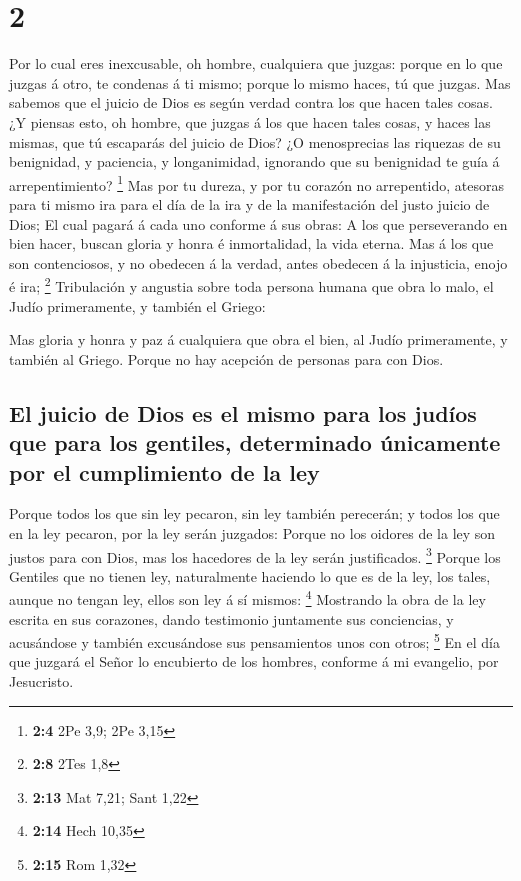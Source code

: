 \hypertarget{section-1}{%
\section{2}\label{section-1}}

 Por lo cual eres inexcusable, oh hombre, cualquiera que
juzgas: porque en lo que juzgas á otro, te condenas á ti mismo; porque
lo mismo haces, tú que juzgas.  Mas sabemos que el juicio
de Dios es según verdad contra los que hacen tales cosas. 
¿Y piensas esto, oh hombre, que juzgas á los que hacen tales cosas, y
haces las mismas, que tú escaparás del juicio de Dios?  ¿O
menosprecias las riquezas de su benignidad, y paciencia, y longanimidad,
ignorando que su benignidad te guía á arrepentimiento? \footnote{\textbf{2:4}
  2Pe 3,9; 2Pe 3,15}  Mas por tu dureza, y por tu corazón
no arrepentido, atesoras para ti mismo ira para el día de la ira y de la
manifestación del justo juicio de Dios;  El cual pagará á
cada uno conforme á sus obras:  A los que perseverando en
bien hacer, buscan gloria y honra é inmortalidad, la vida eterna.
 Mas á los que son contenciosos, y no obedecen á la
verdad, antes obedecen á la injusticia, enojo é ira; \footnote{\textbf{2:8}
  2Tes 1,8}  Tribulación y angustia sobre toda persona
humana que obra lo malo, el Judío primeramente, y también el Griego:

 Mas gloria y honra y paz á cualquiera que obra el bien,
al Judío primeramente, y también al Griego.  Porque no
hay acepción de personas para con Dios.

\hypertarget{el-juicio-de-dios-es-el-mismo-para-los-juduxedos-que-para-los-gentiles-determinado-uxfanicamente-por-el-cumplimiento-de-la-ley}{%
\subsection{El juicio de Dios es el mismo para los judíos que para los
gentiles, determinado únicamente por el cumplimiento de la
ley}\label{el-juicio-de-dios-es-el-mismo-para-los-juduxedos-que-para-los-gentiles-determinado-uxfanicamente-por-el-cumplimiento-de-la-ley}}

 Porque todos los que sin ley pecaron, sin ley también
perecerán; y todos los que en la ley pecaron, por la ley serán juzgados:
 Porque no los oidores de la ley son justos para con
Dios, mas los hacedores de la ley serán justificados. \footnote{\textbf{2:13}
  Mat 7,21; Sant 1,22}  Porque los Gentiles que no tienen
ley, naturalmente haciendo lo que es de la ley, los tales, aunque no
tengan ley, ellos son ley á sí mismos: \footnote{\textbf{2:14} Hech
  10,35}  Mostrando la obra de la ley escrita en sus
corazones, dando testimonio juntamente sus conciencias, y acusándose y
también excusándose sus pensamientos unos con otros; \footnote{\textbf{2:15}
  Rom 1,32}  En el día que juzgará el Señor lo encubierto
de los hombres, conforme á mi evangelio, por Jesucristo.

